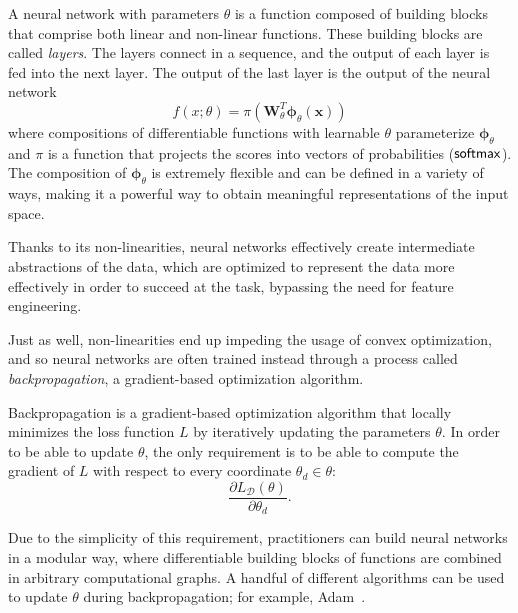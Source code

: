 \begin{definition}
    A neural network with parameters $\theta$ is a function
    composed of building blocks that comprise both linear and non-linear
    functions. These building blocks are called \textit{layers}.
    The layers connect in a sequence, and the output of each
    layer is fed into the next layer. The output of the last layer is
    the output of the neural network
    \begin{equation}
        f(x; \theta) = \pi 
        \left(\bm{W}_{\theta}^T\bm{\phi}_{\theta}\left(\bm{x}\right)\right)
    \end{equation}
    where compositions of differentiable functions with learnable
    $\theta$ parameterize $\bm{\phi}_{\theta}$ and $\pi$ is a
    function that projects the scores into vectors of probabilities (\eg $\operatorname*{\mathsf{softmax}}$).
    The composition of $\bm{\phi}_{\theta}$ is extremely flexible and
    can be defined in a variety of ways, making it a powerful way to
    obtain meaningful representations of the input space.
\end{definition}
%
Thanks to its non-linearities, neural networks effectively create
intermediate abstractions of the data, which are optimized to represent the data
more effectively in order to succeed at the task, bypassing the need
for feature engineering.

Just as well, non-linearities end up
impeding the usage of convex optimization, and so neural networks are
often trained instead through a process called
\textit{backpropagation}, a gradient-based optimization algorithm.

\newpage

\begin{definition}[backpropagation]
    Backpropagation is a gradient-based optimization algorithm that
    locally minimizes the loss function $L$ by iteratively updating the
    parameters $\theta$. In order to be able to update $\theta$,
    the only requirement is to be able to compute the gradient of
    $L$ with respect to every coordinate $\theta_d\in\theta$:
    \begin{equation}
        \frac{\partial L_{\mathcal{D}}(\theta)}{\partial \theta_d}.
    \end{equation}
\end{definition}

Due to the simplicity of this requirement, practitioners can build
neural networks in a modular way, where differentiable building
blocks of functions are combined in arbitrary computational graphs. A
handful of different algorithms can be used to update $\theta$ during
backpropagation; for example, Adam~\citep{kingma2014adam}.

